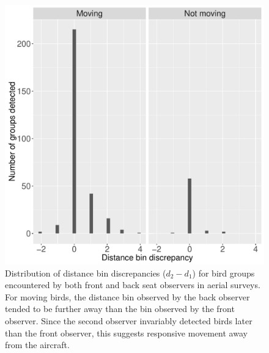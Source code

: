 \documentclass[12pt,fleqn]{article}
\begin{document}
\begin{figure}
\begin{center}
\includegraphics[width=150mm]{Dist_error_hists_JABES.pdf}
\caption{Distribution of distance bin discrepancies ($d_2 - d_1$) for bird groups encountered by both front and back seat observers in aerial surveys.  For moving birds, the distance bin observed by the back observer tended to be further away than the bin observed by the front observer.  Since the second observer invariably detected birds later than the front observer, this suggests responsive movement away from the aircraft. }
\label{fig:dist_hists}
\end{center}
\end{figure}
\end{document}
